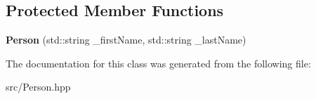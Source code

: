 \subsection*{Protected Member Functions}
\begin{DoxyCompactItemize}
\item 
\mbox{\label{class_person_a8bdbedb3cddca76928a19aaee29ffa37}} 
{\bfseries Person} (std\+::string \+\_\+first\+Name, std\+::string \+\_\+last\+Name)
\end{DoxyCompactItemize}


The documentation for this class was generated from the following file\+:\begin{DoxyCompactItemize}
\item 
src/Person.\+hpp\end{DoxyCompactItemize}
